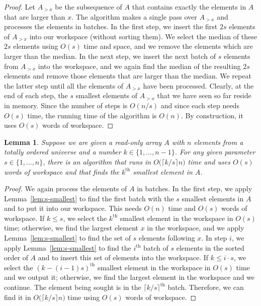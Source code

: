 \documentclass[11pt, a4paper]{article}
\newtheorem{lem}[theorem1]{Lemma}{\bfseries}{\itshape}
\begin{document}
\begin{proof}
Let $A_{> x}$ be the subsequence of $A$ that contains exactly the 
elements in $A$ that are larger than $x$.
The algorithm makes a single pass over $A_{>x}$ and processes the 
elements in batches.
In the first step, we insert the first $2s$ elements of $A_{>x}$ 
into our workspace (without sorting them). We select the median 
of these $2s$ elements using $O(s)$ time and space, and we remove 
the elements which are larger than the median. In the next step, we 
insert the next batch of $s$ elements from $A_{>x}$ into the 
workspace, and we again find the median of the resulting $2s$ 
elements and remove those elements that are larger than the median. 
We repeat the latter step until all the elements of $A_{>x}$ have 
been processed. Clearly, at the end of each step, the $s$ smallest 
elements of $A_{>x}$ that we have seen so far reside in memory. 
Since the number of steps is $O(n/s)$ and since each step needs 
$O(s)$ time, the running time of the 
algorithm is $O(n)$. By construction, it uses $O(s)$ words 
of workspace.
\end{proof}

\begin{lem}\label{lem:k-selection}
Suppose we are given a read-only array $A$ with $n$ elements from 
a totally ordered universe and a number $k \in \{1, \dots, n - 1\}$. 
For any given parameter $s \in \{1, \dots, n\}$, there is an 
algorithm that runs in $O\big(\lceil k/s\rceil n\big)$ time and uses 
$O(s)$ words of workspace and that finds the $k^\text{th}$ smallest 
element in $A$.
\end{lem}
\begin{proof}
We  again process the elements of $A$ in batches.
In the first step, we apply Lemma~\ref{lem:s-smallest} to find the 
first batch with the $s$ smallest elements in $A$ and to put it into 
our workspace. This needs $O(n)$ time and $O(s)$ words of workspace. 
If $k \leq s$, we select the $k^\text{th}$ smallest element in the 
workspace in $O(s)$ time; otherwise, we find the largest element $x$ 
in the workspace, and we apply Lemma~\ref{lem:s-smallest} to find 
the set of $s$ elements following $x$. In step $i$, we apply 
Lemma~\ref{lem:s-smallest} to find
the $i^\text{th}$ batch of $s$ elements 
in the sorted order of $A$ and to insert this set of elements into the workspace. 
If $k \leq i\cdot s$, we select the $(k-(i-1)s)^\text{th}$ smallest 
element in the workspace in $O(s)$ time and we output it; otherwise, 
we find the largest element in the workspace and we continue. 
The element being sought is in the $\lceil k/s\rceil^\text{th}$ 
batch. Therefore, we can find it in 
$O\big(\lceil k/s\rceil n\big)$ time using $O(s)$ words of workspace.
\end{proof}
\end{document}
